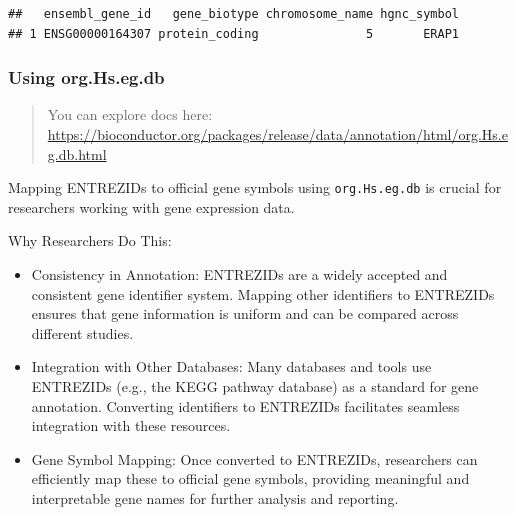 \documentclass[
]{book}
\newenvironment{Shaded}{\begin{snugshade}}{\end{snugshade}}
\newcommand{\AttributeTok}[1]{\textcolor[rgb]{0.13,0.29,0.53}{#1}}
\newcommand{\CommentTok}[1]{\textcolor[rgb]{0.56,0.35,0.01}{\textit{#1}}}
\newcommand{\DecValTok}[1]{\textcolor[rgb]{0.00,0.00,0.81}{#1}}
\newcommand{\FunctionTok}[1]{\textcolor[rgb]{0.13,0.29,0.53}{\textbf{#1}}}
\newcommand{\NormalTok}[1]{#1}
\newcommand{\OtherTok}[1]{\textcolor[rgb]{0.56,0.35,0.01}{#1}}
\newcommand{\SpecialCharTok}[1]{\textcolor[rgb]{0.81,0.36,0.00}{\textbf{#1}}}
\newcommand{\StringTok}[1]{\textcolor[rgb]{0.31,0.60,0.02}{#1}}
\begin{document}
\begin{verbatim}
##   ensembl_gene_id   gene_biotype chromosome_name hgnc_symbol
## 1 ENSG00000164307 protein_coding               5       ERAP1
\end{verbatim}

\hypertarget{using-org.hs.eg.db}{%
\subsubsection{Using org.Hs.eg.db}\label{using-org.hs.eg.db}}

\begin{quote}
You can explore docs here: \url{https://bioconductor.org/packages/release/data/annotation/html/org.Hs.eg.db.html}
\end{quote}

Mapping ENTREZIDs to official gene symbols using \texttt{org.Hs.eg.db} is crucial for researchers working with gene expression data.

Why Researchers Do This:

\begin{itemize}
\item
  Consistency in Annotation: ENTREZIDs are a widely accepted and consistent gene identifier system. Mapping other identifiers to ENTREZIDs ensures that gene information is uniform and can be compared across different studies.
\item
  Integration with Other Databases: Many databases and tools use ENTREZIDs (e.g., the KEGG pathway database) as a standard for gene annotation. Converting identifiers to ENTREZIDs facilitates seamless integration with these resources.
\item
  Gene Symbol Mapping: Once converted to ENTREZIDs, researchers can efficiently map these to official gene symbols, providing meaningful and interpretable gene names for further analysis and reporting.
\end{itemize}

\begin{Shaded}
\end{Shaded}
\end{document}
